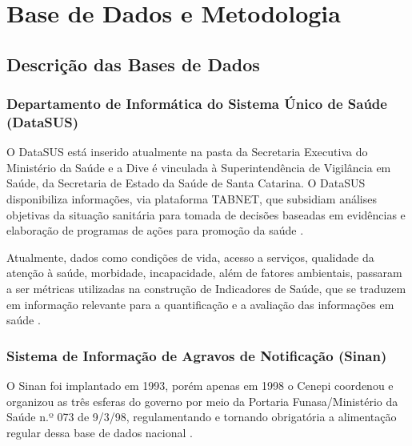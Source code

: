\chapter{Base de Dados e Metodologia}

\section{Descrição das Bases de Dados}

\subsection{Departamento de Informática do Sistema Único de Saúde (DataSUS)}

O \acrshort{DataSUS} está inserido atualmente na pasta da Secretaria Executiva do Ministério da Saúde e a \acrfull{Dive} é vinculada à Superintendência de Vigilância em Saúde, da Secretaria de Estado da Saúde de Santa Catarina. O \acrshort{DataSUS} disponibiliza informações, via plataforma TABNET, que subsidiam  análises objetivas da situação sanitária para tomada de decisões baseadas em evidências e elaboração de programas de ações para promoção da saúde \cite{TABNETMinisterio}.

\indent Atualmente, dados como condições de vida, acesso a serviços, qualidade da atenção à saúde, morbidade, incapacidade, além de fatores ambientais, passaram a ser métricas utilizadas na construção de Indicadores de Saúde, que se traduzem em informação relevante para a quantificação e a avaliação das informações em saúde \cite{TABNETMinisterio}.

\subsection{Sistema de Informação de Agravos de Notificação (Sinan)}

\indent O \acrfull{Sinan} foi implantado em 1993, porém apenas em 1998 o \acrfull{Cenepi} coordenou e organizou as três esferas do governo por meio da Portaria \acrshort{Funasa}/Ministério da Saúde n.º 073 de 9/3/98, regulamentando  e tornando obrigatória a alimentação regular dessa base de dados nacional \cite{SINAN07Ministerio}.

